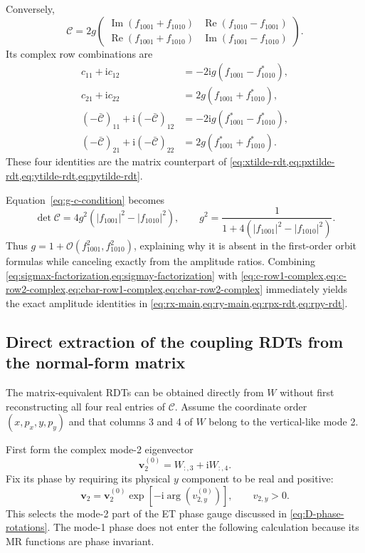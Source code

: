 \documentclass[11pt,a4paper]{article}
\newcommand{\ii}{\mathrm{i}}
\newcommand{\Ree}{\operatorname{Re}}
\newcommand{\Imm}{\operatorname{Im}}
\newcommand{\mat}[1]{\bm{#1}}
\newcommand{\fminus}{f_{1001}}
\newcommand{\fplus}{f_{1010}}
\begin{document}
Conversely,
\begin{equation}
 \boxed{
 \mathcal C=2g
 \begin{pmatrix}
  \Imm(\fminus+\fplus)&\Ree(\fplus-\fminus)\\
  \Ree(\fminus+\fplus)&\Imm(\fminus-\fplus)
 \end{pmatrix}.
 }
 \label{eq:c-from-rdts}
\end{equation}
Its complex row combinations are
\begin{align}
 c_{11}+\ii c_{12}&=-2\ii g(\fminus-\fplus^{*}),
 \label{eq:c-row1-complex}\\
 c_{21}+\ii c_{22}&= 2g(\fminus+\fplus^{*}),
 \label{eq:c-row2-complex}\\
 (-\bar{\mathcal C})_{11}
 +\ii(-\bar{\mathcal C})_{12}
 &=-2\ii g(\fminus^{*}-\fplus^{*}),
 \label{eq:cbar-row1-complex}\\
 (-\bar{\mathcal C})_{21}
 +\ii(-\bar{\mathcal C})_{22}
 &=2g(\fminus^{*}+\fplus^{*}).
 \label{eq:cbar-row2-complex}
\end{align}
These four identities are the matrix counterpart of \cref{eq:xtilde-rdt,eq:pxtilde-rdt,eq:ytilde-rdt,eq:pytilde-rdt}.

Equation~\eqref{eq:g-c-condition} becomes
\begin{equation}
 \det\mathcal C=4g^2\left(|\fminus|^2-|\fplus|^2\right),
 \qquad
 \boxed{
 g^2=\frac{1}{1+4(|\fminus|^2-|\fplus|^2)}.
 }
 \label{eq:g-from-rdts}
\end{equation}
Thus $g=1+\mathcal O(\fminus^2,\fplus^2)$, explaining why it is absent in the
first-order orbit formulas while canceling exactly from the amplitude ratios.
Combining \cref{eq:sigmax-factorization,eq:sigmay-factorization} with
\cref{eq:c-row1-complex,eq:c-row2-complex,eq:cbar-row1-complex,eq:cbar-row2-complex}
immediately yields the exact amplitude identities in
\cref{eq:rx-main,eq:ry-main,eq:rpx-rdt,eq:rpy-rdt}.

\subsection{Direct extraction of the coupling RDTs from the normal-form matrix}
\label{sec:direct-rdts-from-w}

The matrix-equivalent RDTs can be obtained directly from $W$ without first
reconstructing all four real entries of $\mathcal C$.  Assume the coordinate
order $(x,p_x,y,p_y)$ and that columns 3 and 4 of $W$ belong to the
vertical-like mode 2.

First form the complex mode-2 eigenvector
\begin{equation}
 \mat v_2^{(0)}=W_{:,3}+\ii W_{:,4}.
\end{equation}
Fix its phase by requiring its physical $y$ component to be real and positive:
\begin{equation}
 \mat v_2
 =\mat v_2^{(0)}
  \exp\!\left[-\ii\arg\!\left(v_{2,y}^{(0)}\right)\right],
 \qquad v_{2,y}>0.
 \label{eq:v2-et-phase-gauge}
\end{equation}
This selects the mode-2 part of the ET phase gauge discussed in
\cref{eq:D-phase-rotations}.  The mode-1 phase does not enter the following
calculation because its MR functions are phase invariant.
\end{document}
